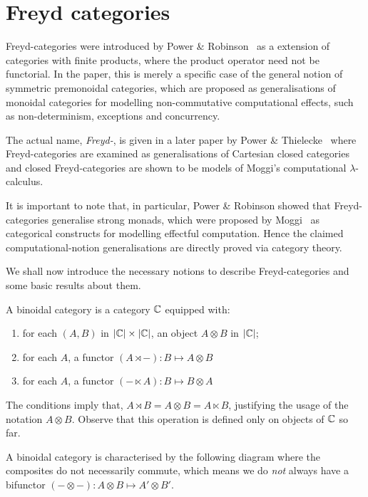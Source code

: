 \section{Freyd categories}

Freyd-categories were introduced by Power \& Robinson~\cite{pow-rob} as a
extension of categories with finite products, where the product operator
need not be functorial. In the paper, this is merely a specific case of the
general notion of symmetric premonoidal categories, which are proposed as
generalisations of monoidal categories for modelling non-commutative
computational effects, such as non-determinism, exceptions and concurrency.

The actual name, \emph{Freyd-}, is given in a later paper by Power \&
Thielecke~\cite{pow-thie} where Freyd-categories are examined as generalisations
of Cartesian closed categories and closed Freyd-categories are shown to be
models of Moggi's computational $\lambda$-calculus.

It is important to note that, in particular, Power \& Robinson showed that
Freyd-categories generalise strong monads, which were proposed by
Moggi~\cite{moggi-89} as categorical constructs for modelling effectful
computation. Hence the claimed computational-notion generalisations are
directly proved via category theory.

We shall now introduce the necessary notions to describe Freyd-categories and
some basic results about them.

\begin{definition}
    A binoidal category is a category $\mathbb{C}$ equipped with:
    \begin{enumerate}
        \item for each $(A, B)$ in $|\mathbb{C}| \times |\mathbb{C}|$, an object $A \otimes B$
            in $|\mathbb{C}|$;
        \item for each $A$, a functor $(A \rtimes -) : B \mapsto A \otimes B$
        \item for each $A$, a functor $(- \ltimes A) : B \mapsto B \otimes A$
    \end{enumerate}
\end{definition}

The conditions imply that, $A \rtimes B = A \otimes B = A \ltimes B$,
justifying the usage of the notation $A \otimes B$. Observe that this
operation is defined only on objects of $\mathbb{C}$ so far.

A binoidal category is characterised by the following diagram
\binoidaldiag
where the composites do not necessarily commute, which means we do \emph{not}
always have a bifunctor $(- \otimes -): A\otimes B \mapsto A' \otimes B'$.

